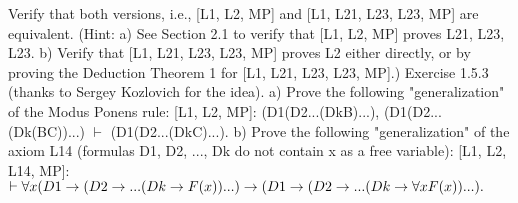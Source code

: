 Verify that both versions, i.e., [L1, L2, MP] and [L1, L21, L23, L23, MP] are equivalent. (Hint: a) See
Section 2.1 to verify that [L1, L2, MP] proves L21, L23, L23. b) Verify that [L1, L21, L23, L23, MP] proves
L2 either directly, or by proving the Deduction Theorem 1 for [L1, L21, L23, L23, MP].)
Exercise 1.5.3 (thanks to Sergey Kozlovich for the idea).
a) Prove the following "generalization" of the Modus Ponens rule:
[L1, L2, MP]: (D1\IMPLIES (D2\IMPLIES ...(Dk\IMPLIES B)...), (D1\IMPLIES (D2\IMPLIES ...(Dk\IMPLIES (B\IMPLIES C))...) \(\vdash\) (D1\IMPLIES (D2\IMPLIES ...(Dk\IMPLIES C)...).
b) Prove the following "generalization" of the axiom L14 (formulas D1, D2, ..., Dk do not contain x as a
free variable):
[L1, L2, L14, MP]: \(\vdash \forall x(D1\rightarrow (D2\rightarrow ...(Dk\rightarrow F(x))...) \rightarrow  (D1\rightarrow (D2\rightarrow ...(Dk\rightarrow \forall xF(x))...).\)

